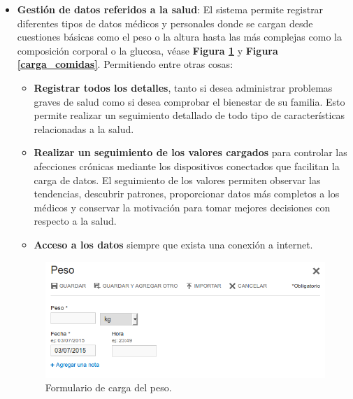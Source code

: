 \begin{itemize}
\item \textbf{Gestión de datos referidos a la salud}:
	El sistema permite registrar diferentes tipos de datos médicos y personales donde se cargan desde cuestiones básicas como el peso o la altura hasta las más complejas como la composición corporal o la glucosa, véase \textbf{Figura \ref{carga_peso}} y \textbf{Figura \ref{carga_comidas}}.  Permitiendo entre otras cosas:
    \begin{itemize}
		\item \textbf{Registrar todos los detalles}, tanto si desea administrar problemas graves de salud como si desea comprobar el bienestar de su familia. Esto permite realizar un seguimiento detallado de todo tipo de características relacionadas a la salud.
        \item \textbf{Realizar un seguimiento de los valores cargados} para controlar las afecciones crónicas mediante los dispositivos conectados que facilitan la carga de datos. El seguimiento de los valores permiten observar las tendencias, descubrir patrones, proporcionar datos más completos a los médicos y conservar la motivación para tomar mejores decisiones con respecto a la salud.
        \item \textbf{Acceso a los datos} siempre que exista una conexión a internet.
	\end{itemize}
 
 	\begin{figure}[h]
      \centering
      \includegraphics[width=.8\textwidth]{img/tp1/3-carga_peso}
      \caption{Formulario de carga del peso.}
      \label{carga_peso}
    \end{figure}   
    

\end{itemize}
